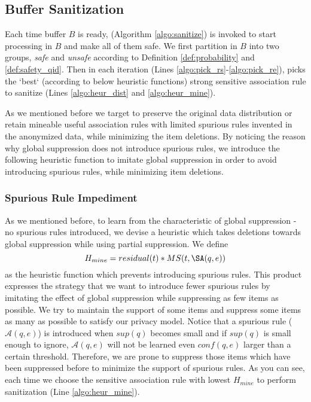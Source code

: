 \subsection{Buffer Sanitization}
\label{sec:sanitize} Each time \qid buffer $B$ is ready, \SanitizeBuffer
(Algorithm \ref{algo:sanitize}) is invoked to start processing \qids in $B$
and make all of them safe. We first partition \qids in $B$ into two groups,
{\em safe} and {\em unsafe} according to Definition \ref{def:probability} and
\ref{def:safety_qid}.
 Then in each iteration (Lines \ref{algo:pick_rs}-\ref{algo:pick_re}), \SanitizeBuffer
 picks the `best` (according to below heuristic functions) strong sensitive association
 rule %
 to sanitize (Lines \ref{algo:heur_dist} and \ref{algo:heur_mine}).

As we mentioned before we target to preserve the original data distribution
or retain mineable useful association rules with limited spurious rules
invented in the anonymized data, while minimizing the item deletions. By
noticing the reason why global suppression does not introduce spurious rules,
we introduce the following heuristic function to imitate global suppression
in order to avoid introducing spurious rules, while minimizing
item deletions.
\subsubsection{Spurious Rule Impediment}

As we mentioned before, to learn from the characteristic of global
suppression - no spurious rules introduced, we devise a heuristic which takes
deletions towards global suppression while using partial suppression. We
define \[H_{mine}=residual(t)*MS(t, \SA(q,e))\] as the heuristic
function which prevents introducing spurious rules.
This product expresses
the strategy that we want to introduce fewer spurious rules by imitating the
effect of global suppression while suppressing as few items as possible.
We try to maintain the support
of some items and suppress some items as many as possible to
satisfy our privacy model. Notice that a spurious rule ($\mathcal{A}(q,e)$) is introduced when
 $sup(q)$ becomes small and if $sup(q)$ is small enough to ignore, $\mathcal{A}(q,e)$
will not be learned even $conf(q,e)$ larger than a certain threshold.
 Therefore, we are prone to
suppress those items which have been suppressed before to minimize the
support of spurious rules. As
you can see, each time we choose the sensitive association rule with lowest
$H_{mine}$ to perform sanitization (Line \ref{algo:heur_mine}).

